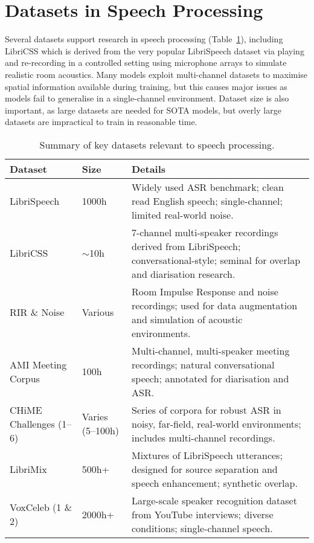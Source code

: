 \section{Datasets in Speech Processing}
Several datasets support research in speech processing (Table~\ref{tab:datasets}), including LibriCSS \cite{libricss} which is derived from the very popular LibriSpeech dataset \cite{librispeech} via playing and re-recording in a controlled setting using microphone arrays to simulate realistic room acoustics. Many models exploit multi-channel datasets to maximise spatial information available during training, but this causes major issues as models fail to generalise in a single-channel environment. Dataset size is also important, as large datasets are needed for SOTA models, but overly large datasets are impractical to train in reasonable time.

\begin{table}[H]
\centering
\caption{Summary of key datasets relevant to speech processing.}
\label{tab:datasets}
\begin{tabular}{|l|l|p{8cm}|}
\hline
\textbf{Dataset} & \textbf{Size} & \textbf{Details} \\ \hline
LibriSpeech \cite{librispeech} & 1000h & Widely used ASR benchmark; clean read English speech; single-channel; limited real-world noise. \\ \hline
LibriCSS \cite{libricss} & $\sim$10h & 7-channel multi-speaker recordings derived from LibriSpeech; conversational-style; seminal for overlap and diarisation research. \\ \hline
RIR \& Noise \cite{RoomImpulseResponseDatabase} & Various & Room Impulse Response and noise recordings; used for data augmentation and simulation of acoustic environments. \\ \hline
AMI Meeting Corpus \cite{ami} & 100h & Multi-channel, multi-speaker meeting recordings; natural conversational speech; annotated for diarisation and ASR. \\ \hline
CHiME Challenges (1--6) \cite{chime} & Varies (5--100h) & Series of corpora for robust ASR in noisy, far-field, real-world environments; includes multi-channel recordings. \\ \hline
LibriMix \cite{librimix} & 500h+ & Mixtures of LibriSpeech utterances; designed for source separation and speech enhancement; synthetic overlap. \\ \hline
VoxCeleb (1 \& 2) \cite{voxceleb,voxceleb2}  & 2000h+ & Large-scale speaker recognition dataset from YouTube interviews; diverse conditions; single-channel speech. \\ \hline
\end{tabular}
\end{table}


